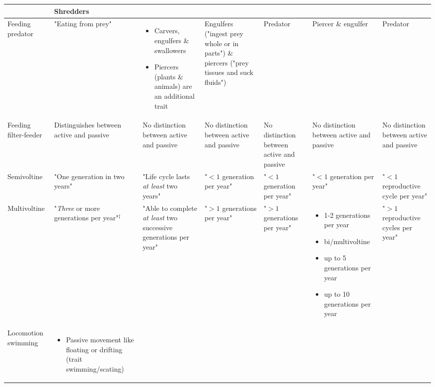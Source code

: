 \documentclass[../Draft_harmonization_paper.tex]{subfiles}
\begin{document}
\begin{landscape}
\begin{longtable}{m{1.9cm}|m{3.3cm}|m{3.3cm}|m{2.7cm}|m{3cm}|m{3.2cm}|m{2.5cm}}
\begin{itemize}
        \end{itemize} & 
        Shredders
        \\ 
        \midrule
        Feeding predator & 
        "Eating from prey" & 
        \begin{itemize}
            \item Carvers, engulfers \& swallowers
            \item Piercers (plants \& animals) are an additional trait
        \end{itemize} & %
        Engulfers ("ingest prey whole or in parts") \& 
        piercers ("prey tissues and suck fluids") & 
        Predator &
        Piercer \& engulfer &
        Predator
        \\ 
        \midrule
        Feeding filter-feeder & 
        Distinguishes between active and passive &
        No distinction between active and passive &
        No distinction between active and passive &
        No distinction between active and passive &
        No distinction between active and passive &
        No distinction between active and passive
        \\
        \toprule[.1em]
        Semivoltine & 
        "One generation in two years" & 
        "Life cycle lasts \textit{at least} two years" & 
        "$< 1$ generation per year" & 
        "$< 1$ generation per year" & 
        "$< 1$ generation per year" & 
        "$< 1$ reproductive cycle per year"
        \\
        \midrule
        Multi\-voltine & 
        "\textit{Three} or more generations per year"$^{\ddagger}$ & 
        "Able to complete \textit{at least} two successive generations per year" &
        "$> 1$ generations per year" &
        "$> 1$ generations per year" & 
        \begin{itemize}
            \item 1-2 generations per year
            \item bi/multivoltine
            \item up to 5 generations per year
            \item up to 10 generations per year
        \end{itemize}
        & 
        "$> 1$ reproductive cycles per year"
        \\
        \toprule[.1em]
        Locomotion swimming & 
        \begin{itemize}
            \item Passive movement like floating or drifting (trait swimming/scating)

\end{itemize}
\end{longtable}
\end{landscape}
\end{document}
